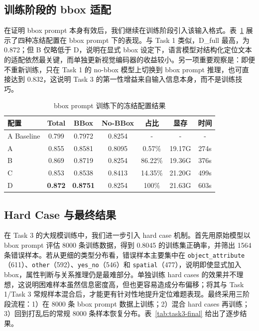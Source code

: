 \documentclass[9pt,twocolumn,a4paper]{ctexart}
\begin{document}
\subsection{训练阶段的 bbox 适配}
在证明 bbox prompt 本身有效后，我们继续在训练阶段引入该输入格式。表~\ref{tab:task3-freeze} 展示了四种冻结配置在 bbox prompt 下的表现。与 Task 1 类似，D\_full 最高，为 0.872；但 B 仅略低于 D，说明在显式 bbox 设定下，语言模型对结构化定位文本的适配依然最关键，而单独更新视觉编码器的收益较小。另一项重要观察是：即便不重新训练，只在 Task 1 的 no-bbox 模型上切换到 bbox prompt 推理，也可直接达到 0.832，这说明 Task 3 的第一性增益来自输入信息本身，而不是训练技巧。

\begin{table}[H]
\centering
\caption{bbox prompt 训练下的冻结配置结果}
\label{tab:task3-freeze}
\scriptsize
\begin{tabular}{lcccccc}
\toprule
配置 & Total & BBox & No-BBox & 占比 & 显存 & 时间 \\
\midrule
A Baseline & 0.799 & 0.7972 & 0.8254 & - & - & - \\
A & 0.855 & 0.8581 & 0.8095 & 0.57\% & 19.17G & 274s \\
B & 0.869 & 0.8719 & 0.8254 & 86.22\% & 19.36G & 376s \\
C & 0.853 & 0.8538 & 0.8413 & 14.35\% & 21.20G & 499s \\
D & \textbf{0.872} & \textbf{0.8751} & 0.8254 & 100\% & 21.63G & 603s \\
\bottomrule
\end{tabular}
\end{table}

\subsection{Hard Case 与最终结果}
在 Task 3 的大规模训练中，我们进一步引入 hard case 机制。首先用原始模型以 bbox prompt 评估 8000 条训练数据，得到 0.8045 的训练集正确率，并筛出 1564 条错误样本。若从更细的类型分布看，错误样本主要集中在 \texttt{object\_attribute}（611）、\texttt{other}（592）、\texttt{yes\_no}（546）和 \texttt{spatial}（477），说明即使显式加入 bbox，属性判断与关系推理仍是最难部分。单独训练 hard cases 的效果并不理想，这说明困难样本虽然信息密度高，但也更容易造成分布偏移；将其与 Task 1/Task 3 常规样本混合后，才能更有针对性地提升定位难题表现。最终采用三阶段流程：1）在 8000 条 bbox prompt 数据上训练；2）混合 hard cases 再训练；3）回到打乱后的常规 8000 条样本恢复分布。表~\ref{tab:task3-final} 给出了逐步结果。
\end{document}
